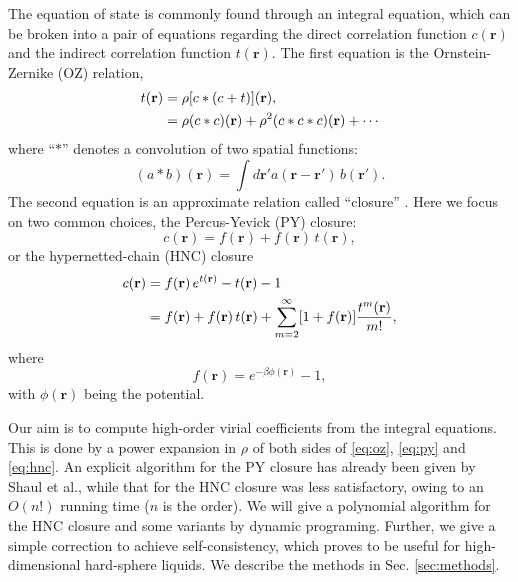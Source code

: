 \documentclass[aip,jcp,reprint,superscriptaddress]{revtex4-1}
\newcommand{\vct}[1]{\mathbf{#1}}
\providecommand{\vr}{} %
\renewcommand{\vr}{\vct{r}}
\newcommand{\secref}[1]{Sec. \ref{#1}}
\begin{document}
The equation of state is commonly found
  through an integral equation, which
  can be broken into a pair of equations
  regarding the direct correlation function $c(\vr)$
  and the indirect correlation function $t(\vr)$.
%
The first equation is the Ornstein-Zernike (OZ) relation\cite{hansen},
%
\begin{align}
  t(\vr) &= \rho [c * (c + t)](\vr), \notag \\
         &= \rho (c*c)(\vr) + \rho^2 (c*c*c)(\vr) + \cdots
\label{eq:oz}
\end{align}
%
where ``$*$'' denotes a convolution of two spatial functions:
\begin{equation}
  (a * b)(\vr) = \int d\vr' a(\vr - \vr') \, b(\vr').
\label{eq:convol}
\end{equation}
%
The second equation is an approximate relation called ``closure'' \cite{hansen}.
%
Here we focus on two common choices,
%
the Percus-Yevick (PY) closure\cite{percusyevick}:
%
\begin{equation}
  c(\vr) = f(\vr) + f(\vr) \, t(\vr),
  \label{eq:py}
\end{equation}
%
or the hypernetted-chain (HNC) closure\cite{
morita1958, *morita1959, *morita1960}
%
\begin{align}
  c(\vr) &= f(\vr) \, e^{t(\vr)} - t(\vr) - 1 \notag \\
         &= f(\vr) + f(\vr) \, t(\vr)
          + \sum_{m=2}^\infty [1 + f(\vr)] \frac{ t^m(\vr) }{ m! },
  \label{eq:hnc}
\end{align}
%
where
\begin{equation}
  f(\vr) = e^{-\beta \phi(\vr)} - 1,
  \label{eq:fbond}
\end{equation}
with $\phi(\vr)$ being the potential.



Our aim is to compute high-order virial coefficients from
  the integral equations.
%
This is done by a power expansion in $\rho$ of both sides
  of \eqref{eq:oz}, \eqref{eq:py} and \eqref{eq:hnc}.
%
An explicit algorithm for the PY closure has already
  been given by Shaul et al.\cite{sspk},
  while that for the HNC closure was less satisfactory,
  owing to an $O(n!)$ running time ($n$ is the order).
%
We will give a polynomial algorithm for the HNC closure
  and some variants by dynamic programing.
%
Further, we give a simple correction to achieve self-consistency,
  which proves to be useful for high-dimensional hard-sphere liquids.
%
We describe the methods in \secref{sec:methods}.
\end{document}
